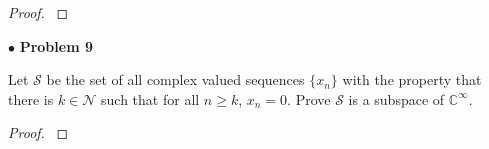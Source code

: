 \documentclass{article}
\begin{document}
\begin{proof}
$ $ \newline
\end{proof}


\newpage
$\bullet$ \textbf{Problem 9}
\medskip

\begin{itshape}
Let $\mathcal{S}$ be the set of all complex valued sequences $\{ x_{n} \}$ with the property that there is $k \in \mathcal{N}$ such that for all $n \ge k$, $x_{n} = 0$. Prove $\mathcal{S}$ is a subspace of $\mathbb{C}^\infty$.
\end{itshape}
\medskip

\begin{proof}
$ $ \newline
\end{proof}
\end{document}
